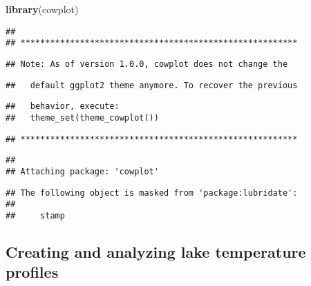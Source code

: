 \documentclass[]{article}
\newenvironment{Shaded}{\begin{snugshade}}{\end{snugshade}}
\newcommand{\KeywordTok}[1]{\textcolor[rgb]{0.13,0.29,0.53}{\textbf{#1}}}
\newcommand{\NormalTok}[1]{#1}
\newcommand{\OperatorTok}[1]{\textcolor[rgb]{0.81,0.36,0.00}{\textbf{#1}}}
\newcommand{\StringTok}[1]{\textcolor[rgb]{0.31,0.60,0.02}{#1}}
\begin{document}
\begin{Shaded}
\begin{Highlighting}[]
\KeywordTok{library}\NormalTok{(cowplot)}
\end{Highlighting}
\end{Shaded}

\begin{verbatim}
## 
## ********************************************************
\end{verbatim}

\begin{verbatim}
## Note: As of version 1.0.0, cowplot does not change the
\end{verbatim}

\begin{verbatim}
##   default ggplot2 theme anymore. To recover the previous
\end{verbatim}

\begin{verbatim}
##   behavior, execute:
##   theme_set(theme_cowplot())
\end{verbatim}

\begin{verbatim}
## ********************************************************
\end{verbatim}

\begin{verbatim}
## 
## Attaching package: 'cowplot'
\end{verbatim}

\begin{verbatim}
## The following object is masked from 'package:lubridate':
## 
##     stamp
\end{verbatim}

\begin{Shaded}
\end{Shaded}

\hypertarget{creating-and-analyzing-lake-temperature-profiles}{%
\subsection{Creating and analyzing lake temperature
profiles}\label{creating-and-analyzing-lake-temperature-profiles}}
\end{document}
